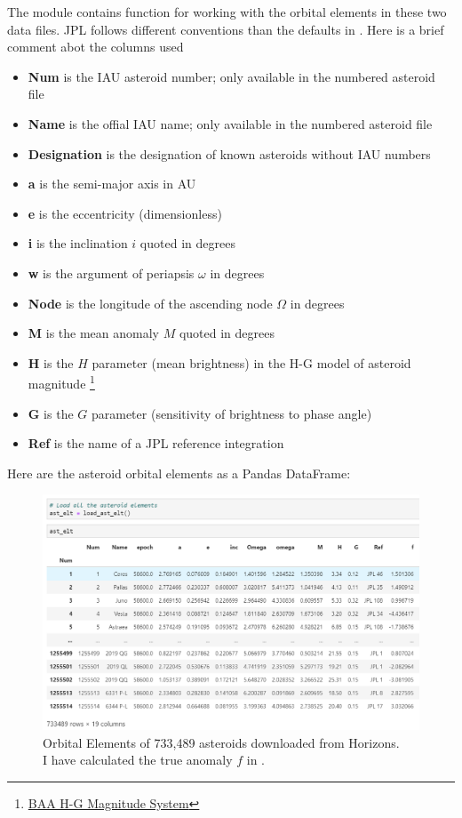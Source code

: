 The module  contains function for working with the orbital elements in these two data files.
JPL follows different conventions than the defaults in .
Here is a brief comment abot the columns used
\begin{itemize}
\item \textbf{Num} is the IAU asteroid number; only available in the numbered asteroid file
\item \textbf{Name} is the offial IAU name; only available in the numbered asteroid file
\item \textbf{Designation} is the designation of known asteroids without IAU numbers
\item \textbf{a} is the semi-major axis in AU
\item \textbf{e} is the eccentricity (dimensionless)
\item \textbf{i} is the inclination $i$ quoted in degrees
\item \textbf{w} is the argument of periapsis $\omega$ in degrees
\item \textbf{Node} is the longitude of the ascending node $\Omega$ in degrees
\item \textbf{M} is the mean anomaly $M$ quoted in degrees
\item \textbf{H} is the $H$ parameter (mean brightness) in the H-G model of asteroid magnitude 
\footnote{\href{https://www.britastro.org/asteroids/dymock4.pdf}{BAA H-G Magnitude System} }
\item \textbf{G} is the $G$ parameter (sensitivity of brightness to phase angle)
\item \textbf{Ref} is the name of a JPL reference integration
\end{itemize}

Here are the asteroid orbital elements as a Pandas DataFrame:
\begin{figure}[hbt!]
\begin{center}
\includegraphics[width=1.0\textwidth]{../figs/elts/ast_elt_dataframe.png}
\caption{Orbital Elements of 733,489 asteroids downloaded from Horizons.\\
I have calculated the true anomaly $f$ in .}
\end{center}
\end{figure}
\clearpage

